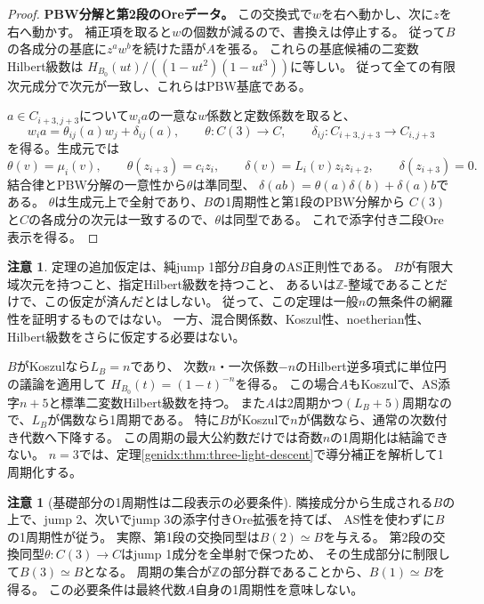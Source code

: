 \documentclass[11pt,a4paper]{ltjsarticle}
\theoremstyle{definition}
\newtheorem{remark}[theorem]{注意}
\begin{document}
\begin{proof}
\par\smallskip\noindent\textbf{PBW分解と第2段のOreデータ。}\quad
この交換式で$w$を右へ動かし、次に$z$を右へ動かす。
補正項を取ると$w$の個数が減るので、書換えは停止する。
従って$B$の各成分の基底に$z^a w^b$を続けた語が$A$を張る。
これらの基底候補の二変数Hilbert級数は
$H_{B_0}(ut)/((1-ut^2)(1-ut^3))$に等しい。
従って全ての有限次元成分で次元が一致し、これらはPBW基底である。

$a\in C_{i+3,j+3}$について$w_i a$の一意な$w$係数と定数係数を取ると、
\[
w_i a=\theta_{ij}(a)w_j+\delta_{ij}(a),\qquad
\theta:C(3)\to C,\qquad
\delta_{ij}:C_{i+3,j+3}\to C_{i,j+3}
\]
を得る。生成元では
\[
\theta(v)=\mu_i(v),\qquad\theta(z_{i+3})=c_i z_i,\qquad
\delta(v)=L_i(v)z_i z_{i+2},\qquad\delta(z_{i+3})=0.
\]
結合律とPBW分解の一意性から$\theta$は準同型、
$\delta(ab)=\theta(a)\delta(b)+\delta(a)b$である。
$\theta$は生成元上で全射であり、$B$の1周期性と第1段のPBW分解から
$C(3)$と$C$の各成分の次元は一致するので、$\theta$は同型である。
これで添字付き二段Ore表示を得る。
\end{proof}

\begin{remark}
定理の追加仮定は、純jump 1部分$B$自身のAS正則性である。
$B$が有限大域次元を持つこと、指定Hilbert級数を持つこと、
あるいは$\mathbb Z$-整域であることだけで、この仮定が済んだとはしない。
従って、この定理は一般$n$の無条件の網羅性を証明するものではない。
一方、混合関係数、Koszul性、noetherian性、Hilbert級数をさらに仮定する必要はない。

$B$がKoszulなら$L_B=n$であり、
次数$n$・一次係数$-n$のHilbert逆多項式に単位円の議論を適用して
$H_{B_0}(t)=(1-t)^{-n}$を得る。
この場合$A$もKoszulで、AS添字$n+5$と標準二変数Hilbert級数を持つ。
また$A$は2周期かつ$(L_B+5)$周期なので、$L_B$が偶数なら1周期である。
特に$B$がKoszulで$n$が偶数なら、通常の次数付き代数へ下降する。
この周期の最大公約数だけでは奇数$n$の1周期化は結論できない。
$n=3$では、定理\ref{genidx:thm:three-light-descent}で導分補正を解析して1周期化する。
\end{remark}


\begin{remark}[基礎部分の1周期性は二段表示の必要条件]
隣接成分から生成される$B$の上で、jump 2、次いでjump 3の添字付きOre拡張を持てば、
AS性を使わずに$B$の1周期性が従う。
実際、第1段の交換同型は$B(2)\simeq B$を与える。
第2段の交換同型$\theta:C(3)\to C$はjump 1成分を全単射で保つため、
その生成部分に制限して$B(3)\simeq B$となる。
周期の集合が$\mathbb Z$の部分群であることから、$B(1)\simeq B$を得る。
この必要条件は最終代数$A$自身の1周期性を意味しない。
\end{remark}
\end{document}
